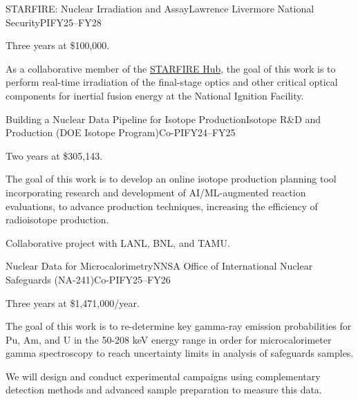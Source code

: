 \begin{rSubsection}{STARFIRE: Nuclear Irradiation and Assay}{\textnormal{Lawrence Livermore National Security}}{PI}{FY25--FY28}
\item    Three years at \$100,000.
\item As a collaborative member of the \href{https://ife.llnl.gov/starfire-hub}{STARFIRE Hub}, the goal of this work is to perform real-time irradiation of the final-stage optics and other critical optical components for inertial fusion energy at the National Ignition Facility.


\end{rSubsection}

\begin{rSubsection}{Building a Nuclear Data Pipeline for Isotope Production}{\textnormal{Isotope R\&D and Production (DOE Isotope Program)}}{Co-PI}{FY24--FY25}
\item    Two years at \$305,143.
\item The goal of this work is to develop an online isotope production planning tool incorporating research and development of AI/ML-augmented reaction evaluations, to  advance  production techniques, increasing the efficiency of radioisotope production.
\item Collaborative project with LANL, BNL, and TAMU.


\end{rSubsection}

\begin{rSubsection}{Nuclear Data for Microcalorimetry}{\textnormal{NNSA Office of International Nuclear Safeguards (NA-241)}}{Co-PI}{FY25--FY26}
\item    Three years at \$1,471,000/year.
\item The goal of this work is to re-determine key gamma-ray emission probabilities for Pu, Am, and U in the 50-208 keV energy range in order for microcalorimeter gamma spectroscopy to reach uncertainty limits in analysis of safeguards samples.
\item We will design and conduct experimental campaigns using complementary detection methods and advanced sample preparation to measure this data.


\end{rSubsection}

